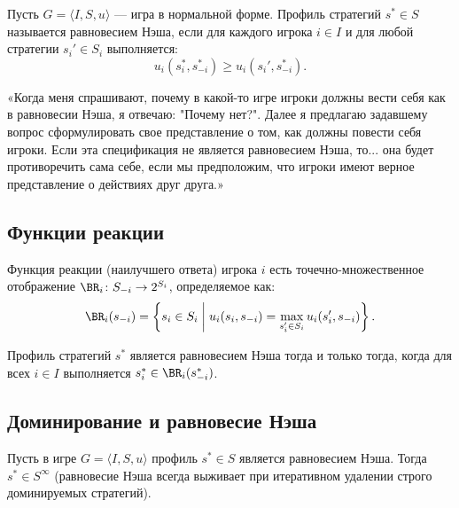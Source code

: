\begin{definition}
Пусть $G = \langle I, S, u \rangle$ — игра в нормальной форме. Профиль стратегий $s^* \in S$ называется равновесием Нэша, если для каждого игрока $i \in I$ и для любой стратегии $s_i' \in S_i$ выполняется:
\begin{equation}
    u_i(s_i^*, s_{-i}^*) \ge u_i(s_i', s_{-i}^*).
\end{equation}
\end{definition}

\begin{remark}
«Когда меня спрашивают, почему в какой-то игре игроки должны вести себя как в равновесии Нэша, я отвечаю: "Почему нет?". Далее я предлагаю задавшему вопрос сформулировать свое представление о том, как должны повести себя игроки. Если эта спецификация не является равновесием Нэша, то... она будет противоречить сама себе, если мы предположим, что игроки имеют верное представление о действиях друг друга.»
\end{remark}

\subsection{Функции реакции}

\begin{definition}
Функция реакции (наилучшего ответа) игрока $i$ есть точечно-множественное отображение $\BR_i \colon S_{-i} \to 2^{S_i}$, определяемое как:
\begin{equation}
    \BR_i(s_{-i}) = \left\{ s_i \in S_i \;\middle|\; u_i(s_i, s_{-i}) = \max_{s_i' \in S_i} u_i(s_i', s_{-i}) \right\}.
\end{equation}
\end{definition}

\begin{lemma}
Профиль стратегий $s^*$ является равновесием Нэша тогда и только тогда, когда для всех $i \in I$ выполняется $s_i^* \in \BR_i(s_{-i}^*)$.
\end{lemma}

\subsection{Доминирование и равновесие Нэша}

\begin{lemma}\label{lem:nash_survives}
Пусть в игре $G = \langle I, S, u \rangle$ профиль $s^* \in S$ является равновесием Нэша. Тогда $s^* \in S^\infty$ (равновесие Нэша всегда выживает при итеративном удалении строго доминируемых стратегий).
\end{lemma}


